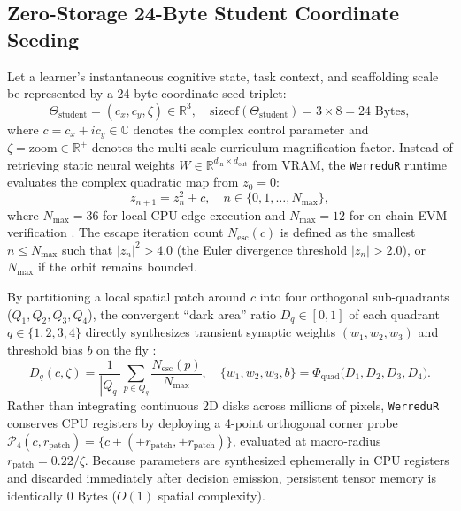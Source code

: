 \documentclass[10pt,twocolumn,a4paper]{article}
\begin{document}
\subsection{Zero-Storage 24-Byte Student Coordinate Seeding}
Let a learner's instantaneous cognitive state, task context, and scaffolding scale be represented by a 24-byte coordinate seed triplet:
\begin{equation}
    \Theta_{\text{student}} = (c_x, c_y, \zeta) \in \mathbb{R}^3, \quad \text{sizeof}(\Theta_{\text{student}}) = 3 \times 8 = 24\text{ Bytes},
    \label{eq:seed}
\end{equation}
where $c = c_x + i c_y \in \mathbb{C}$ denotes the complex control parameter and $\zeta = \text{zoom} \in \mathbb{R}^+$ denotes the multi-scale curriculum magnification factor. Instead of retrieving static neural weights $W \in \mathbb{R}^{d_{\text{in}} \times d_{\text{out}}}$ from VRAM, the \texttt{WerreduR} runtime evaluates the complex quadratic map from $z_0 = 0$:
\begin{equation}
    z_{n+1} = z_n^2 + c, \quad n \in \{0, 1, \dots, N_{\max}\},
    \label{eq:mandelbrot}
\end{equation}
where $N_{\max} = 36$ for local CPU edge execution and $N_{\max} = 12$ for on-chain EVM verification \cite{dagli2026lean4}. The escape iteration count $N_{\text{esc}}(c)$ is defined as the smallest $n \le N_{\max}$ such that $|z_n|^2 > 4.0$ (the Euler divergence threshold $|z_n| > 2.0$), or $N_{\max}$ if the orbit remains bounded.

By partitioning a local spatial patch around $c$ into four orthogonal sub-quadrants ($Q_1, Q_2, Q_3, Q_4$), the convergent ``dark area'' ratio $D_q \in [0, 1]$ of each quadrant $q \in \{1,2,3,4\}$ directly synthesizes transient synaptic weights $(w_1, w_2, w_3)$ and threshold bias $b$ on the fly \cite{dagli2026mandelbrot}:
\begin{equation}
    D_q(c, \zeta) = \frac{1}{|Q_q|} \sum_{p \in Q_q} \frac{N_{\text{esc}}(p)}{N_{\max}}, \quad \{w_1, w_2, w_3, b\} = \Phi_{\text{quad}}\big(D_1, D_2, D_3, D_4\big).
\end{equation}
Rather than integrating continuous 2D disks across millions of pixels, \texttt{WerreduR} conserves CPU registers by deploying a 4-point orthogonal corner probe $\mathcal{P}_4(c, r_{\text{patch}}) = \{c + (\pm r_{\text{patch}}, \pm r_{\text{patch}})\}$, evaluated at macro-radius $r_{\text{patch}} = 0.22 / \zeta$. Because parameters are synthesized ephemerally in CPU registers and discarded immediately after decision emission, persistent tensor memory is identically $0\text{ Bytes}$ ($O(1)$ spatial complexity).
\end{document}
